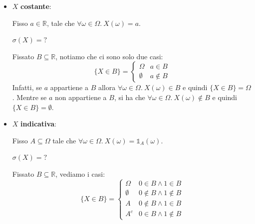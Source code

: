   \begin{itemize}
  \item $ X $ \textbf{costante}:

    Fisso $ a \in \mathbb{R} $, tale che $ \forall \omega \in \Omega.\ X(\omega) = a $.

    $ \sigma(X) = ? $

    Fissato $ B \subseteq \mathbb{R} $, notiamo che ci sono solo due casi:
    \[
    \{X \in B\} = \begin{cases}
    \Omega & a \in B\\
    \emptyset & a \notin B
    \end{cases}
    \]
      Infatti, se $ a $ appartiene a $ B $ allora $ \forall \omega \in \Omega.\ X(\omega) \in B $ e quindi $ \{X \in B\} = \Omega $. Mentre se $ a $ non appartiene a $ B $, si ha che $ \forall \omega \in \Omega.\ X(\omega) \notin B $ e quindi $ \{X \in B\} = \emptyset $.
  \item $ X $ \textbf{indicativa}:

    Fisso $ A \subseteq \Omega $ tale che $ \forall \omega \in \Omega.\ X(\omega) = \mathbb{1}_A(\omega) $.

    $ \sigma(X) = ? $

    Fissato $ B \subseteq \mathbb{R} $, vediamo i casi:
      \[
      \{X \in B\} = \begin{cases}
      \Omega & 0 \in B \land 1 \in B\\
      \emptyset & 0 \notin B \land 1 \notin B\\
      A & 0 \notin B \land 1 \in B\\
      A^{c} & 0 \in B \land 1 \notin B
      \end{cases}
      \]
  \end{itemize}   


